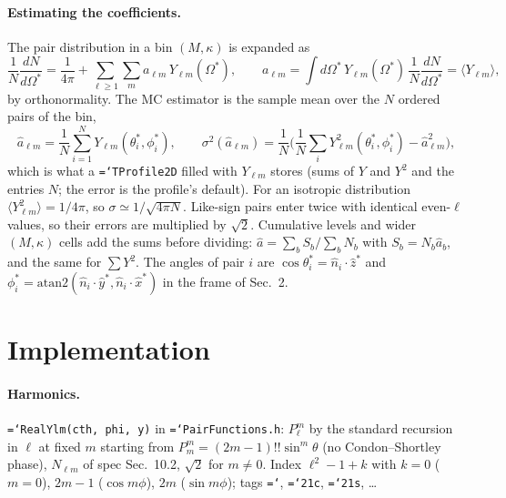 \documentclass[11pt,a4paper]{article}
\newcommand{\code}[1]{\texttt{\hyphenchar\font=`\-#1}}
\begin{document}
\paragraph{Estimating the coefficients.} The pair distribution in a bin $(M,\kappa)$ is expanded as
\begin{equation}
\frac{1}{N}\frac{dN}{d\Omega^*}=\frac{1}{4\pi}+\sum_{\ell\ge1}\sum_m a_{\ell m}\,Y_{\ell m}(\Omega^*),\qquad
a_{\ell m}=\int d\Omega^*\,Y_{\ell m}(\Omega^*)\,\frac1N\frac{dN}{d\Omega^*}=\langle Y_{\ell m}\rangle,
\end{equation}
by orthonormality. The MC estimator is the sample mean over the $N$ ordered pairs of the bin,
\begin{equation}
\hat a_{\ell m}=\frac1N\sum_{i=1}^NY_{\ell m}(\theta^*_i,\phi^*_i),\qquad
\sigma^2(\hat a_{\ell m})=\frac1N\Big(\frac1N\sum_iY_{\ell m}^2(\theta^*_i,\phi^*_i)-\hat a_{\ell m}^2\Big),
\end{equation}
which is what a \code{TProfile2D} filled with $Y_{\ell m}$ stores (sums of $Y$ and $Y^2$ and the entries
$N$; the error is the profile's default). For an isotropic distribution $\langle Y_{\ell m}^2\rangle=1/4\pi$,
so $\sigma\simeq1/\sqrt{4\pi N}$. Like-sign pairs enter twice with identical even-$\ell$ values, so their
errors are multiplied by $\sqrt2$. Cumulative levels and wider $(M,\kappa)$ cells add the sums before
dividing: $\hat a=\sum_bS_b/\sum_bN_b$ with $S_b=N_b\hat a_b$, and the same for $\sum Y^2$. The angles of
pair $i$ are $\cos\theta^*_i=\hat n_i\cdot\hat z^*$ and $\phi^*_i=\mathrm{atan2}(\hat n_i\cdot\hat y^*,\hat n_i\cdot\hat x^*)$
in the frame of Sec.~2.

\section{Implementation}

\paragraph{Harmonics.} \code{RealYlm(cth, phi, y)} in \code{PairFunctions.h}: $P_\ell^m$ by the
standard recursion in $\ell$ at fixed $m$ starting from $P_m^m=(2m-1)!!\sin^m\theta$ (no
Condon--Shortley phase), $N_{\ell m}$ of spec Sec.~10.2, $\sqrt2$ for $m\neq0$. Index
$\ell^2-1+k$ with $k=0$ ($m=0$), $2m-1$ ($\cos m\phi$), $2m$ ($\sin m\phi$); tags \code{10},
\code{21c}, \code{21s}, \dots
\end{document}
